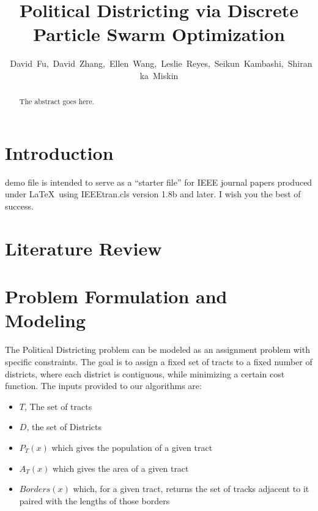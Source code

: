 \documentclass[journal]{IEEEtran}
\begin{document}
\title{Political Districting via Discrete Particle Swarm Optimization}
\author{~David~Fu,~David~Zhang,~Ellen~Wang,~Leslie~Reyes,~Seikun~Kambashi,~Shiranka~Miskin}
\maketitle

\begin{abstract}
The abstract goes here.
\end{abstract}

\section{Introduction}
 demo file is intended to serve as a ``starter file''
for IEEE journal papers produced under \LaTeX\ using
IEEEtran.cls version 1.8b and later.
I wish you the best of success.


\section{Literature Review}

\section{Problem Formulation and Modeling}
The Political Districting problem can be modeled as an assignment problem with
specific constraints.  The goal is to assign a fixed set of tracts to a fixed
number of districts, where each district is contiguous, while minimizing a
certain cost function.  The inputs provided to our algorithms are:

\begin{itemize}
\item $T$, The set of tracts
\item $D$, the set of Districts
\item $P_T(x)$ which gives the population of a given tract
\item $A_T(x)$ which gives the area of a given tract
\item $Borders(x)$ which, for a given tract, returns the set of tracks adjacent to it paired with the lengths of those borders
\end{itemize}
\end{document}
